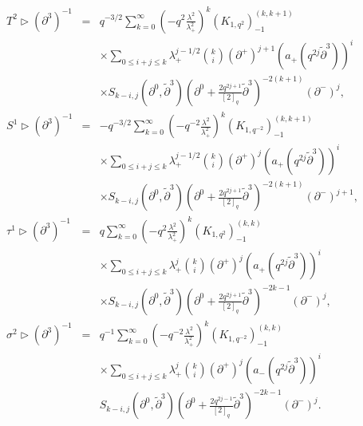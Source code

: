 \documentclass[a4paper,11pt,oneside]{article}
\begin{document}
\begin{eqnarray}
T^{2}\triangleright \left( \partial ^{3}\right) ^{-1}
&=&q^{-3/2}\sum_{k=0}^{\infty }\left( -q^{2}\frac{\lambda ^{2}}{\lambda
_{+}^{2}}\right) ^{k}\left( K_{1,q^{2}}\right) _{-1}^{\left( k,k+1\right) }
 \\
&&\times \sum_{0\leq i+j\leq k}\lambda _{+}^{j-1/2} {k \choose i}\left(
\partial ^{+}\right) ^{j+1}\left( a_{+}\left( q^{2j}\tilde{\partial}%
^{3}\right) \right) ^{i}  \nonumber \\
&&\times S_{k-i,j}\left( \partial ^{0},\tilde{\partial}^{3}\right) \left(
\partial ^{0}+\frac{2q^{2j+1}}{\left[ 2\right] _{q}}\tilde{\partial}%
^{3}\right) ^{-2\left( k+1\right) }\left( \partial ^{-}\right) ^{j}, 
\nonumber \\[0.1in]
S^{1}\triangleright \left( \partial ^{3}\right) ^{-1}
&=&-q^{-3/2}\sum_{k=0}^{\infty }\left( -q^{-2}\frac{\lambda ^{2}}{\lambda
_{+}^{2}}\right) ^{k}\left( K_{1,q^{-2}}\right) _{-1}^{\left( k,k+1\right) }
\\
&&\times \sum_{0\leq i+j\leq k}\lambda _{+}^{j-1/2}{k \choose i}\left(
\partial ^{+}\right) ^{j}\left( a_{+}\left( q^{2j}\tilde{\partial}%
^{3}\right) \right) ^{i}  \nonumber \\
&&\times S_{k-i,j}\left( \partial ^{0},\tilde{\partial}^{3}\right) \left(
\partial ^{0}+\frac{2q^{2j+1}}{\left[ 2\right] _{q}}\tilde{\partial}%
^{3}\right) ^{-2\left( k+1\right) }\left( \partial ^{-}\right) ^{j+1}, 
\nonumber \\[0.1in]
\tau ^{1}\triangleright \left( \partial ^{3}\right) ^{-1}
&=&q\sum_{k=0}^{\infty }\left( -q^{2}\frac{\lambda ^{2}}{\lambda _{+}^{2}}%
\right) ^{k}\left( K_{1,q^{2}}\right) _{-1}^{\left( k,k\right) } \\
&&\times \sum_{0\leq i+j\leq k}\lambda _{+}^{j}{k \choose i}\left( \partial
^{+}\right) ^{j}\left( a_{+}\left( q^{2j}\tilde{\partial}^{3}\right) \right)
^{i}  \nonumber \\
&&\times S_{k-i,j}\left( \partial ^{0},\tilde{\partial}^{3}\right) \left(
\partial ^{0}+\frac{2q^{2j+1}}{\left[ 2\right] _{q}}\tilde{\partial}%
^{3}\right) ^{-2k-1}\left( \partial ^{-}\right) ^{j},  \nonumber \\[0.1in]
\sigma ^{2}\triangleright \left( \partial ^{3}\right) ^{-1}
&=&q^{-1}\sum_{k=0}^{\infty }\left( -q^{-2}\frac{\lambda ^{2}}{\lambda
_{+}^{2}}\right) ^{k}\left( K_{1,q^{-2}}\right) _{-1}^{\left(
k,k\right) }
\label{Wirkungen} \\
&&\times \sum_{0\leq i+j\leq k}\lambda _{+}^{j}{k \choose i}\left( \partial
^{+}\right) ^{j}\left( a_{-}\left( q^{2j}\tilde{\partial}^{3}\right) \right)
^{i}  \nonumber \\
&&S_{k-i,j}\left( \partial ^{0},\tilde{\partial}^{3}\right) \left( \partial
^{0}+\frac{2q^{2j-1}}{\left[ 2\right] _{q}}\tilde{\partial}^{3}\right)
^{-2k-1}\left( \partial ^{-}\right) ^{j}.  \nonumber
\end{eqnarray}
\end{document}
